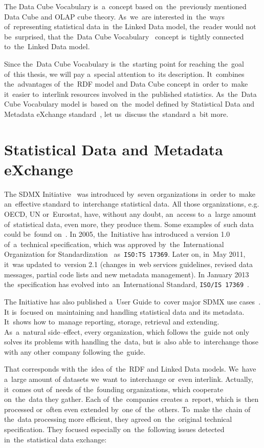 The Data Cube Vocabulary is~a~concept based on~the~previously mentioned Data Cube and
OLAP cube theory. As~we~are interested in~the~ways of~representing statistical data in~the
Linked Data model, the~reader would not be~surprised, that the~Data Cube 
Vocabulary~\cite{dcv}
concept is~tightly connected to~the~Linked Data model.

Since the~Data Cube Vocabulary is~the~starting point for reaching the~goal of~this thesis,
we will pay a~special attention to~its description. It~combines the~advantages of~the~RDF
model and Data Cube concept in~order to~make it~easier to~interlink resources involved
in the~published statistics. As~the~Data Cube Vocabulary model is~based on~the~model defined
by Statistical Data and Metadata eXchange standard~\cite{sdmx}, let us~discuss the~standard a~bit more.

\section{Statistical Data and Metadata eXchange}
The SDMX Initiative~\cite{sdmx} was introduced by~seven organizations in~order to~make
an~effective standard to~interchange statistical data. All those organizations, e.g. OECD,
UN or~Eurostat, have, without any doubt, an~access to~a~large amount of~statistical data, even more,
they produce them. Some examples of~such data could be~found on~\cite{pubdata}.
In 2005, the~Initiative has introduced a
version 1.0 of~a~technical specification, which was approved by~the~International
Organization for Standardization~\cite{iso} as~\texttt{ISO:TS 17369}.
Later on, in~May 2011, it~was updated to~version 2.1 (changes in~web services guidelines,
revised data messages, partial code lists and new metadata management).
In January 2013 the~specification has evolved into~an~International Standard,
\texttt{ISO/IS 17369}~\cite{isosdmx}.

The Initiative has also published a~User Guide to~cover major SDMX use cases~\cite{sdmxuserguide}.
It is~focused on~maintaining and handling statistical data and its metadata. It~shows
how to~manage reporting, storage, retrieval and extending. As~a~natural side--effect,
every organization, which follows the~guide not only solves its problems with
handling the~data, but is~also able to~interchange those with any other company
following the~guide.

That corresponds with the~idea of~the~RDF and Linked Data models. We~have a~large amount
of datasets we~want to~interchange or~even interlink. Actually, it~comes out of~needs
of the~founding organizations, which cooperate on~the~data they gather. Each of~the~companies creates
a~report, which is~then processed or~often even extended by~one of~the~others. To~make the~chain
of the~data processing more efficient, they agreed on~the~original technical specification.
They focused especially on~the~following issues detected in~the~statistical data exchange:

